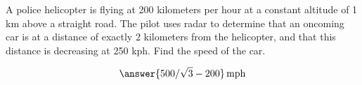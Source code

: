\documentclass{ximera}
\author{Bart Snapp}
\begin{document}
\begin{exercise}

A police helicopter is flying at 200 kilometers per hour at
a constant altitude of 1 km above a straight road.  The pilot uses
radar to determine that an oncoming car is at a distance of exactly 2
kilometers from the helicopter, and that this distance is decreasing at 250
kph.  Find the speed of the car.
\begin{prompt}
  \[
  \answer{500/\sqrt{3}-200}\,\text{mph}
  \]
\end{prompt}
\end{exercise}
\end{document}
